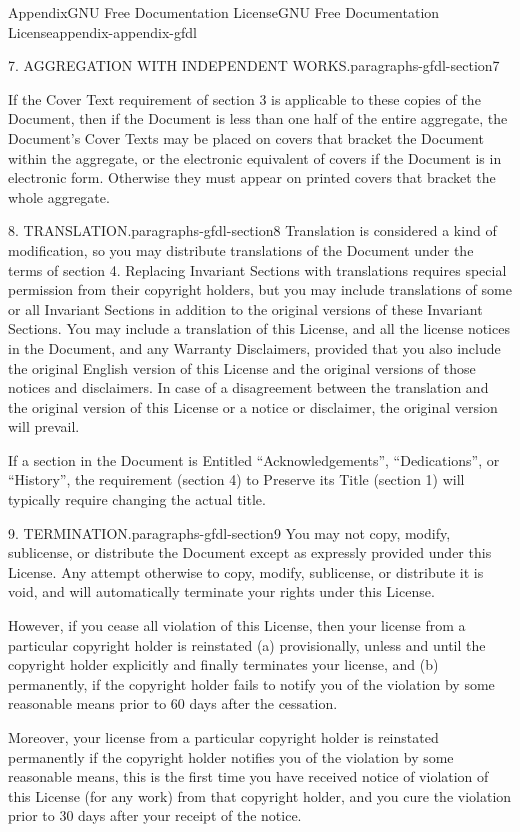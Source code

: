 \documentclass[twoside,10pt,]{book}
\numberwithin{equation}{part}
\begin{document}
\begin{appendixptx}{Appendix}{GNU Free Documentation License}{}{GNU Free Documentation License}{}{}{appendix-appendix-gfdl}
\begin{paragraphs}{7. AGGREGATION WITH INDEPENDENT WORKS.}{paragraphs-gfdl-section7}
\par
If the Cover Text requirement of section 3 is applicable to these copies of the Document, then if the Document is less than one half of the entire aggregate, the Document's Cover Texts may be placed on covers that bracket the Document within the aggregate, or the electronic equivalent of covers if the Document is in electronic form. Otherwise they must appear on printed covers that bracket the whole aggregate.%
\end{paragraphs}%
\begin{paragraphs}{8. TRANSLATION.}{paragraphs-gfdl-section8}%
Translation is considered a kind of modification, so you may distribute translations of the Document under the terms of section 4. Replacing Invariant Sections with translations requires special permission from their copyright holders, but you may include translations of some or all Invariant Sections in addition to the original versions of these Invariant Sections. You may include a translation of this License, and all the license notices in the Document, and any Warranty Disclaimers, provided that you also include the original English version of this License and the original versions of those notices and disclaimers. In case of a disagreement between the translation and the original version of this License or a notice or disclaimer, the original version will prevail.%
\par
If a section in the Document is Entitled ``Acknowledgements'', ``Dedications'', or ``History'', the requirement (section 4) to Preserve its Title (section 1) will typically require changing the actual title.%
\end{paragraphs}%
\begin{paragraphs}{9. TERMINATION.}{paragraphs-gfdl-section9}%
You may not copy, modify, sublicense, or distribute the Document except as expressly provided under this License. Any attempt otherwise to copy, modify, sublicense, or distribute it is void, and will automatically terminate your rights under this License.%
\par
However, if you cease all violation of this License, then your license from a particular copyright holder is reinstated (a) provisionally, unless and until the copyright holder explicitly and finally terminates your license, and (b) permanently, if the copyright holder fails to notify you of the violation by some reasonable means prior to 60 days after the cessation.%
\par
Moreover, your license from a particular copyright holder is reinstated permanently if the copyright holder notifies you of the violation by some reasonable means, this is the first time you have received notice of violation of this License (for any work) from that copyright holder, and you cure the violation prior to 30 days after your receipt of the notice.%

\end{paragraphs}
\end{appendixptx}
\end{document}

